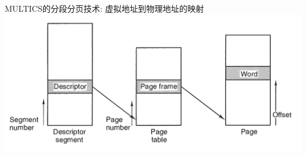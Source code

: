 \documentclass[xcolor=svgnames]{beamer}
\begin{document}
\begin{CJK*}{UTF8}{gbsn}
\begin{frame}{MULTICS的分段分页技术: 虚拟地址到物理地址的映射}
\includegraphics[width=1.0\textwidth]{seg4.png}
\end{frame}




%

%


\end{CJK*}
\end{document}
